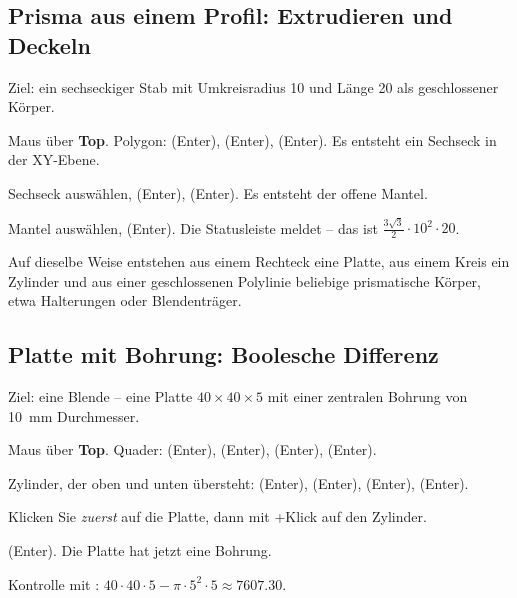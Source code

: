 \subsection{Prisma aus einem Profil: Extrudieren und Deckeln}\label{sec:bsp-prisma}

Ziel: ein sechseckiger Stab mit Umkreisradius 10 und Länge 20 als geschlossener Körper.

\begin{schritte}
\item Maus über \textbf{Top}. Polygon:  (Enter),  (Enter), 
  (Enter). Es entsteht ein Sechseck in der XY-Ebene.
\item Sechseck auswählen,  (Enter),  (Enter). Es entsteht der offene
  Mantel.
\item Mantel auswählen,  (Enter). Die Statusleiste meldet
   -- das ist
  $\frac{3\sqrt{3}}{2} \cdot 10^2 \cdot 20$.
\end{schritte}

Auf dieselbe Weise entstehen aus einem Rechteck eine Platte, aus einem Kreis ein Zylinder und
aus einer geschlossenen Polylinie beliebige prismatische Körper, etwa Halterungen oder
Blendenträger.

\subsection{Platte mit Bohrung: Boolesche Differenz}\label{sec:bsp-platte}

Ziel: eine Blende -- eine Platte $40 \times 40 \times 5$ mit einer zentralen Bohrung von
\SI{10}{mm} Durchmesser.

\begin{schritte}
\item Maus über \textbf{Top}. Quader:  (Enter),  (Enter),
   (Enter),  (Enter).
\item Zylinder, der oben und unten übersteht:  (Enter),  (Enter),
   (Enter),  (Enter).
\item Klicken Sie \emph{zuerst} auf die Platte, dann mit +Klick auf den Zylinder.
\item {} (Enter). Die Platte hat jetzt eine Bohrung.
\item Kontrolle mit : $40 \cdot 40 \cdot 5 - \pi \cdot 5^2 \cdot 5 \approx
  \num{7607.30}$.
\end{schritte}

